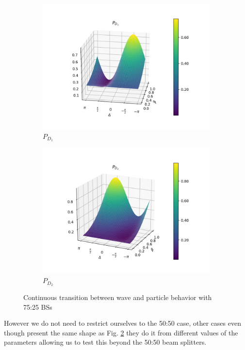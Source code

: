 \documentclass{book}
\begin{document}
\begin{figure}[H]
\centering
\begin{subfigure}[b]{0.40\linewidth}
\includegraphics[width=\linewidth]{images/pd1_2_pi3.png}
\caption{$P_{D_{1}}$}
\end{subfigure}
\begin{subfigure}[b]{0.40\linewidth}
\includegraphics[width=\linewidth]{images/pd2_2_pi3.png}
\caption{$P_{D_{2}}$ }
\label{fig:BS1}
\end{subfigure}
\caption{Continuous transition between wave and particle behavior with 75:25 BSs}
\label{pi/3}
\end{figure}


However we do not need to restrict ourselves to the 50:50 case, other cases even though present the same shape as Fig. \ref{pi/3} they do it from different values of the parameters allowing us to test this beyond the 50:50 beam splitters.
\end{document}
